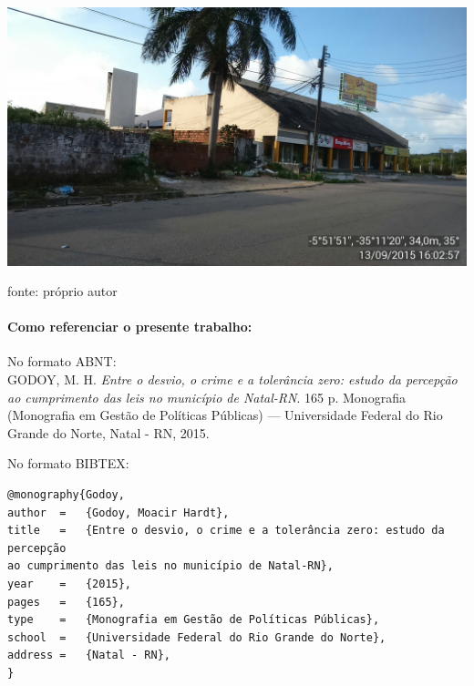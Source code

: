 \documentclass[
	12pt,				%
	openright,			%
	twoside,			%
	a4paper,			%
	chapter=TITLE,		%
	section=TITLE,		%
	subsection=TITLE,	%
	subsubsection=TITLE,%
	spanish,            %
	english,			%
	brazil				%
	]{abntex2}
\begin{document}
\begin{anexosenv}
\begin{foto}[!htpb]
	\begin{center}
		\includegraphics[scale=0.23]{Mauro4.jpg}
	\end{center}
	\ABNTEXchapterfont\small{fonte: próprio autor}
\end{foto}
\end{anexosenv}
\newpage
\thispagestyle{plain}
\paragraph*{\textbf{Como referenciar o presente trabalho:}}

No formato ABNT:\\
GODOY, M. H. \textit{Entre o desvio, o crime e a tolerância zero: estudo da percepção ao
cumprimento das leis no município de Natal-RN}. 165 p. Monografia (Monografia em Gestão
de Políticas Públicas) — Universidade Federal do Rio Grande do Norte, Natal - RN, 2015.


No formato BIBTEX:
\begin{verbatim}
@monography{Godoy,
author	=	{Godoy, Moacir Hardt},
title	=   {Entre o desvio, o crime e a tolerância zero: estudo da percepção 
ao cumprimento das leis no município de Natal-RN},
year	=	{2015},
pages	=	{165},
type	=	{Monografia em Gestão de Políticas Públicas},
school	=	{Universidade Federal do Rio Grande do Norte},
address	=	{Natal - RN},
}
\end{verbatim}
\end{document}
